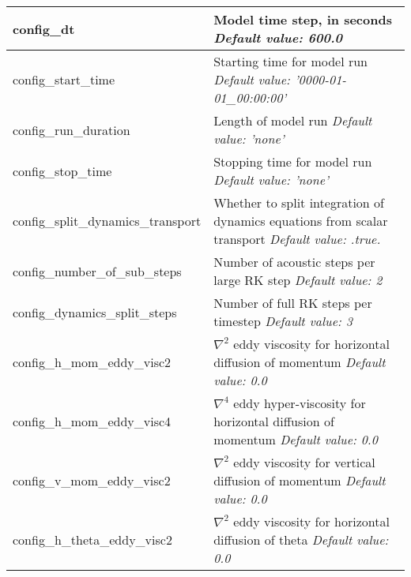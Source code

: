 {\small
\begin{longtable}{|p{1.75in} |p{4.5in}|}
 \hline   
   config\_dt & Model time step, in seconds \newline 
   {\em Default value: 600.0} \\ \hline

   config\_start\_time & Starting time for model run \newline 
   {\em Default value: '0000-01-01\_00:00:00'} \\ \hline

   config\_run\_duration & Length of model run \newline 
   {\em Default value: 'none'} \\ \hline

   config\_stop\_time  & Stopping time for model run \newline 
   {\em Default value: 'none'} \\ \hline

   config\_split\_dynamics\_transport & Whether to split integration of dynamics equations from scalar transport \newline 
   {\em Default value: .true.} \\ \hline
   
   config\_number\_of\_sub\_steps & Number of acoustic steps per large RK step \newline 
   {\em Default value: 2} \\ \hline

   config\_dynamics\_split\_steps & Number of full RK steps per timestep \newline 
   {\em Default value: 3} \\ \hline

   config\_h\_mom\_eddy\_visc2 & $\nabla^2$ eddy viscosity for horizontal diffusion of momentum \newline 
   {\em Default value: 0.0} \\ \hline

   config\_h\_mom\_eddy\_visc4 & $\nabla^4$ eddy hyper-viscosity for horizontal diffusion of momentum \newline 
   {\em Default value: 0.0} \\ \hline

   config\_v\_mom\_eddy\_visc2 & $\nabla^2$ eddy viscosity for vertical diffusion of momentum \newline 
   {\em Default value: 0.0} \\ \hline

   config\_h\_theta\_eddy\_visc2 & $\nabla^2$ eddy viscosity for horizontal diffusion of theta \newline 
   {\em Default value: 0.0} \\ \hline


\end{longtable}}
